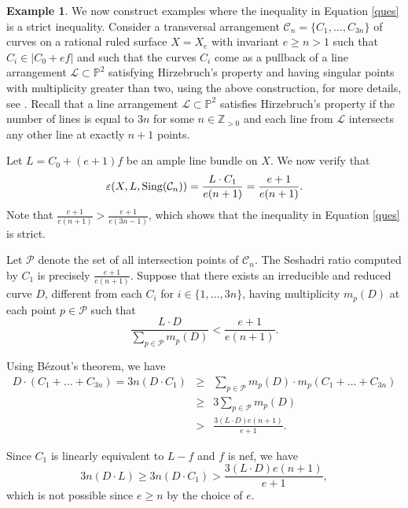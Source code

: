 \documentclass[12pt,reqno]{amsart}
\theoremstyle{plain}
\numberwithin{equation}{section}
\theoremstyle{definition}
\newtheorem{example}[theorem]{Example}
\begin{document}
	\begin{example}\label{Hirz}
		We now construct examples where the inequality in Equation \ref{ques} is a strict inequality. Consider a transversal arrangement $\mathcal{C}_n = \{C_{1}, \ldots, C_{3n}\}$ of curves on a rational ruled surface $X=X_e$ with invariant $e\ge n>1$ such that $ C_i \in |C_0+ef|$ and such that the curves $C_i$ come as a pullback of a line arrangement $\mathcal{L} \subset \mathbb{P}^2$ satisfying Hirzebruch's property and having singular points with multiplicity greater than two, using the above construction, for more details, see \cite{Pok}. Recall that a line arrangement $\mathcal{L} \subset \mathbb{P}^2$ satisfies  Hirzebruch's property if the number of lines is equal to $3n$ for some $n \in \mathbb{Z}_{>0}$ and each line from $\mathcal{L}$ intersects any other line at exactly $n+1$ points. 
		
		Let $L=C_0+(e+1)f$ be an ample line bundle on $X$. We now verify that  
		$$\varepsilon(X, L,{\rm Sing}(\mathcal{C}_n)) = \frac{L\cdot C_1}{e(n+1)}=\frac{e+1}{e(n+1)}.$$
		Note that $\frac{e+1}{e(n+1)} > \frac{e+1}{e(3n-1)}$, which shows that the 
		inequality in Equation \ref{ques} is strict. 	
		
		
		Let $\mathcal{P}$ denote the set of all intersection points of $\mathcal{C}_n$. 
		The Seshadri ratio computed by $C_1$ is precisely $\frac{e+1}{e(n+1)}$. 
		Suppose that there exists an irreducible and reduced curve $D$, different from each $C_{i}$ for $i \in \{1,\ldots, 3n\}$, having multiplicity $m_{p}(D)$ at each point $p \in \mathcal{P}$ such that
		\begin{equation}\label{eg ineq}
			\frac{L \cdot D}{\sum_{p \in \mathcal{P}} m_{p}(D)} < \frac{e+1}{e(n+1)}.
		\end{equation}
		
		Using B\'ezout's theorem, we have
		\begin{eqnarray*}D\cdot (C_{1}+ \ldots + C_{3n})=3n(D\cdot C_1) &\geq& \sum_{p \in \mathcal{P}}m_{p}(D)\cdot m_{p}(C_1+\ldots+C_{3n}) \\ &\geq &3\sum_{p \in \mathcal{P}} m_{p}(D)\\ &>&\frac{3(L \cdot D)e(n+1)}{e+1}.\end{eqnarray*}
		
		Since $C_1$ is linearly equivalent to $L-f$ and $f$ is nef,  we have $$3n(D \cdot L) \geq 3n(D \cdot C_{1})>\frac{3(L \cdot D)e(n+1)}{e+1},$$ which is not possible since $e \ge n$ by the choice of $e$. 
		
	\end{example}
	
\end{document}
